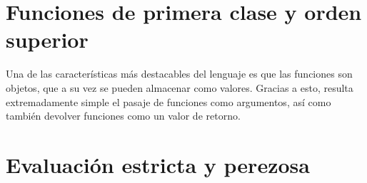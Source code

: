 \section{Funciones de primera clase y orden superior}

Una de las características más destacables del lenguaje es que las funciones son objetos, que a su vez se pueden almacenar como valores. Gracias a esto, resulta extremadamente simple el pasaje de funciones como argumentos, así como también devolver funciones como un valor de retorno.

\section{Evaluación estricta y perezosa}